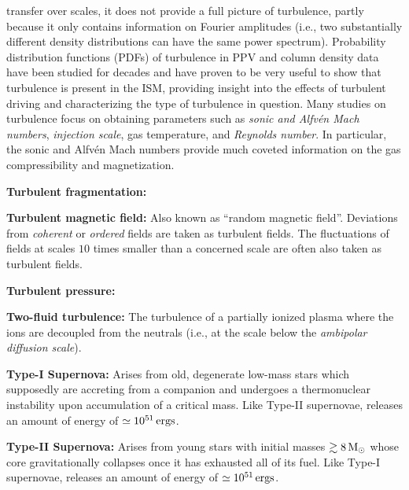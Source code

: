 \documentclass[a4paper,10pt]{article}
\begin{document}
transfer over scales, it does not provide a full picture of turbulence, partly because it only contains information on Fourier amplitudes (i.e., two substantially different density distributions can have the same power spectrum). Probability distribution functions (PDFs) of turbulence in PPV and column density data have been studied for decades and have proven to be very useful to show that turbulence is present in the ISM, providing insight into the effects of turbulent driving and characterizing the type of turbulence in question. Many studies on turbulence focus on obtaining parameters such as \textit{sonic and Alfv\'en Mach numbers}, \textit{injection scale}, gas temperature, and \textit{Reynolds number}. In particular, the sonic and Alfv\'en Mach numbers provide much coveted information on the gas compressibility and magnetization.

{\noindent}\textbf{Turbulent fragmentation:}

{\noindent}\textbf{Turbulent magnetic field:} Also known as ``random magnetic field''. Deviations from \textit{coherent} or \textit{ordered} fields are taken as turbulent fields. The fluctuations of fields at scales $10$ times smaller than a concerned scale are often also taken as turbulent fields.

{\noindent}\textbf{Turbulent pressure:}

{\noindent}\textbf{Two-fluid turbulence:} The turbulence of a partially ionized plasma where the ions are decoupled from the neutrals (i.e., at the scale below the \textit{ambipolar diffusion scale}).

{\noindent}\textbf{Type-I Supernova:} Arises from old, degenerate low-mass stars which supposedly are accreting from a companion and undergoes a thermonuclear instability upon accumulation of a critical mass. Like Type-II supernovae, releases an amount of energy of $\simeq10^{51}\,{\rm ergs}$.

{\noindent}\textbf{Type-II Supernova:} Arises from young stars with initial masses $\gtrsim8\,{\rm M}_\odot$ whose core gravitationally collapses once it has exhausted all of its fuel. Like Type-I supernovae, releases an amount of energy of $\simeq10^{51}\,{\rm ergs}$.
\end{document}
